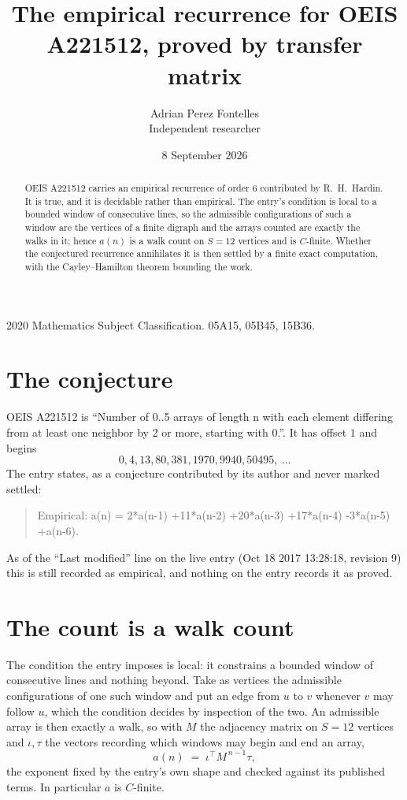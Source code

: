 \documentclass[11pt,a4paper]{article}
\title{The empirical recurrence for OEIS A221512, proved by transfer matrix}
\author{Adrian Perez Fontelles\\ \small Independent researcher}
\date{8 September 2026}
\theoremstyle{plain}
\theoremstyle{definition}
\begin{document}
\maketitle

\begin{abstract}
OEIS A221512 carries an empirical recurrence of order $6$ contributed by R.~H.~Hardin. It is
true, and it is decidable rather than empirical. The entry's condition is local to a bounded window of consecutive lines, so
the admissible configurations of such a window are the vertices of a finite digraph and the
arrays counted are exactly the walks in it; hence $a(n)$ is a walk count on $S=12$ vertices
and is $C$-finite. Whether the conjectured recurrence annihilates it is then settled by a
finite exact computation, with the Cayley--Hamilton theorem bounding the work.
\end{abstract}

\noindent\small 2020 Mathematics Subject Classification. 05A15, 05B45, 15B36.\normalsize

\section{The conjecture}

OEIS A221512 is ``Number of 0..5 arrays of length n with each element differing from at least one neighbor by 2 or more, starting with 0.''. It has offset $1$ and begins
\[
0, 4, 13, 80, 381, 1970, 9940, 50495,\ \dots
\]
The entry states, as a conjecture contributed by its author and never marked settled:
\begin{quote}
Empirical: a(n) = 2*a(n-1) +11*a(n-2) +20*a(n-3) +17*a(n-4) -3*a(n-5) +a(n-6).
\end{quote}
As of the ``Last modified'' line on the live entry (Oct 18 2017 13:28:18, revision 9) this is still
recorded as empirical, and nothing on the entry records it as proved.

\section{The count is a walk count}

The condition the entry imposes is local: it constrains a bounded window of consecutive lines and nothing beyond. Take as
vertices the admissible configurations of one such window and put an edge from $u$ to $v$
whenever $v$ may follow $u$, which the condition decides by inspection of the two. An
admissible array is then exactly a walk, so with $M$ the adjacency matrix on $S=12$ vertices
and $\iota,\tau$ the vectors recording which windows may begin and end an array,
\[
a(n)\;=\;\iota^{\!\top}M^{\,n-1}\tau ,
\]
the exponent fixed by the entry's own shape and checked against its published terms. In
particular $a$ is $C$-finite.
\end{document}
